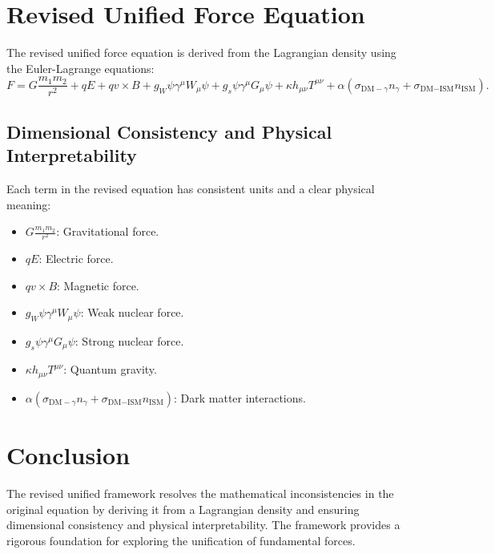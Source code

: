 \documentclass[12pt]{article}
\begin{document}
\section{Revised Unified Force Equation}
The revised unified force equation is derived from the Lagrangian density using the Euler-Lagrange equations:
\[
F = G \frac{m_1 m_2}{r^2} + qE + qv \times B + g_W \psi \gamma^\mu W_\mu \psi + g_s \psi \gamma^\mu G_\mu \psi + \kappa h_{\mu\nu} T^{\mu\nu} + \alpha (\sigma_{\text{DM}-\gamma} n_\gamma + \sigma_{\text{DM}-\text{ISM}} n_{\text{ISM}}).
\]

\subsection*{Dimensional Consistency and Physical Interpretability}
Each term in the revised equation has consistent units and a clear physical meaning:
\begin{itemize}
    \item $G \frac{m_1 m_2}{r^2}$: Gravitational force.
    \item $qE$: Electric force.
    \item $qv \times B$: Magnetic force.
    \item $g_W \psi \gamma^\mu W_\mu \psi$: Weak nuclear force.
    \item $g_s \psi \gamma^\mu G_\mu \psi$: Strong nuclear force.
    \item $\kappa h_{\mu\nu} T^{\mu\nu}$: Quantum gravity.
    \item $\alpha (\sigma_{\text{DM}-\gamma} n_\gamma + \sigma_{\text{DM}-\text{ISM}} n_{\text{ISM}})$: Dark matter interactions.
\end{itemize}

\section{Conclusion}
The revised unified framework resolves the mathematical inconsistencies in the original equation by deriving it from a Lagrangian density and ensuring dimensional consistency and physical interpretability. The framework provides a rigorous foundation for exploring the unification of fundamental forces.
\end{document}
